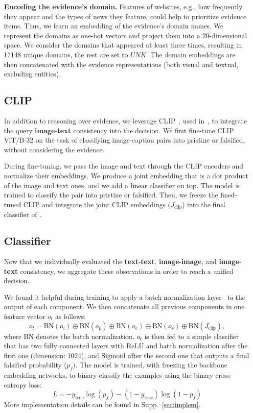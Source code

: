 \textbf{Encoding the evidence's domain.} 
Features of websites, e.g., how frequently they appear and the types of news they feature, could help to prioritize evidence items. 
Thus, we learn an embedding of the evidence's domain names. We represent the domains as one-hot vectors and project them into a 20-dimensional space. We consider the domains that appeared at least three times, resulting in 17148 unique domains, the rest are set to $\textit{UNK}$. The domain embeddings are then concatenated with the evidence representations (both visual and textual, excluding entities).

\subsection{CLIP}
In addition to reasoning over evidence, we leverage CLIP~\cite{radford2021learning}, used in~\cite{luo2021newsclippings}, to integrate the query \textbf{\textcolor{myOrange}{image}}-\textbf{\textcolor{myblue}{text}} consistency into the decision. We first fine-tune CLIP ViT/B-32 on the task of classifying image-caption pairs into pristine or falsified, without considering the evidence. 

During fine-tuning, we pass the image and text through the CLIP encoders and normalize their embeddings. We produce a joint embedding that is a dot product of the image and text ones, and we add a linear classifier on top. The model is trained to classify the pair into pristine or falsified. Then, we freeze the fined-tuned CLIP and integrate the joint CLIP embeddings ($J_\text{clip}$) into the final classifier of \model{}.  

\subsection{Classifier}
Now that we individually evaluated the \textbf{\textcolor{myblue}{text}}-\textbf{\textcolor{myblue}{text}}, \textbf{\textcolor{myOrange}{image}}-\textbf{\textcolor{myOrange}{image}}, and \textbf{\textcolor{myOrange}{image}}-\textbf{\textcolor{myblue}{text}} consistency, we aggregate these observations in order to reach a unified decision. 

We found it helpful during training to apply a batch normalization layer~\cite{ioffe2015batch} to the output of each component. We then concatenate all previous components in one feature vector $o_t$ as follows:
\begin{equation} \label{eqn:bn}
    o_t = \text{BN}(o_i)\oplus\text{BN}(o_p)\oplus\text{BN}(o_e)\oplus\text{BN}(o_s)\oplus\text{BN}(J_\text{clip}), 
\end{equation}
where $\text{BN}$ denotes the batch normalization. $o_t$ is then fed to a simple classifier that has two fully connected layers with ReLU and batch normalization after the first one (dimension: 1024), and Sigmoid after the second one that outputs a final falsified probability ($p_f$). The model is trained, with freezing the backbone embedding networks, to binary classify the examples using the binary cross-entropy loss: 
\begin{equation}
L = -y_\text{true}\log(p_f) - (1-y_\text{true})\log(1-p_f)
\end{equation}
More implementation details can be found in Supp.~\ref{sec:implem}.